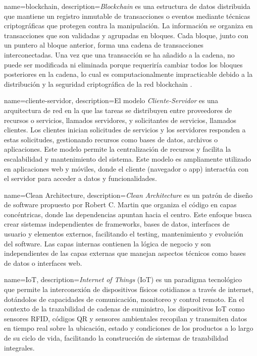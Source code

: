 
{
    name=blockchain,
    description={\textit{Blockchain} es una estructura de datos distribuida que mantiene un registro inmutable de transacciones o eventos mediante técnicas criptográficas que protegen contra la manipulación. La información se organiza en transacciones que son validadas y agrupadas en bloques. Cada bloque, junto con un puntero al bloque anterior, forma una cadena de transacciones interconectadas. Una vez que una transacción se ha añadido a la cadena, no puede ser modificada ni eliminada porque requeriría cambiar todos los bloques posteriores en la cadena, lo cual es computacionalmente impracticable debido a la distribución y la seguridad criptográfica de la red blockchain \cite{rennock2018blockchain}.}
}

{
    name=cliente-servidor,
    description={El modelo \textit{Cliente-Servidor} es una arquitectura de red en la que las tareas se distribuyen entre proveedores de recursos o servicios, llamados servidores, y solicitantes de servicios, llamados clientes. Los clientes inician solicitudes de servicios y los servidores responden a estas solicitudes, gestionando recursos como bases de datos, archivos o aplicaciones. Este modelo permite la centralización de recursos y facilita la escalabilidad y mantenimiento del sistema. Este modelo es ampliamente utilizado en aplicaciones web y móviles, donde el cliente (navegador o app) interactúa con el servidor para acceder a datos y funcionalidades.}
}

{
    name=Clean Architecture,
    description={\textit{Clean Architecture} es un patrón de diseño de software propuesto por Robert C. Martin que organiza el código en capas concéntricas, donde las dependencias apuntan hacia el centro. Este enfoque busca crear sistemas independientes de frameworks, bases de datos, interfaces de usuario y elementos externos, facilitando el testing, mantenimiento y evolución del software. Las capas internas contienen la lógica de negocio y son independientes de las capas externas que manejan aspectos técnicos como bases de datos o interfaces web.}
}

{
    name=IoT,
    description={\textit{Internet of Things} (IoT) es un paradigma tecnológico que permite la interconexión de dispositivos físicos cotidianos a través de internet, dotándolos de capacidades de comunicación, monitoreo y control remoto. En el contexto de la trazabilidad de cadenas de suministro, los dispositivos IoT como sensores RFID, códigos QR y sensores ambientales recopilan y transmiten datos en tiempo real sobre la ubicación, estado y condiciones de los productos a lo largo de su ciclo de vida, facilitando la construcción de sistemas de trazabilidad integrales.}
}

